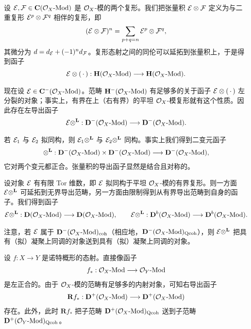设 $\mathcal{E},\mathcal{F}\in\mathbf{C}(\mathcal{O}_X\text{-}\mathrm{Mod})$ 是 $\mathcal{O}_X$-模的两个复形。我们把张量积 $\mathcal{E}\otimes\mathcal{F}$ 定义为与二重复形 $\mathcal{E}^{p}\otimes\mathcal{F}^{q}$ 相伴的复形，即
\begin{equation*}
(\mathcal{E}\otimes\mathcal{F})^{n}=\sum_{p+q=n}\mathcal{E}^{p}\otimes\mathcal{F}^{q},
\end{equation*}
其微分为 $d=d_{\mathcal{E}}+(-1)^{n}d_{\mathcal{F}}$。复形态射之间的同伦可以延拓到张量积上，于是得到函子
\begin{equation*}
\mathcal{E}\otimes(\,\cdot\,):\mathbf{H}(\mathcal{O}_X\text{-}\mathrm{Mod})\longrightarrow\mathbf{H}(\mathcal{O}_X\text{-}\mathrm{Mod}).
\end{equation*}

现在设 $\mathcal{E}\in\mathbf{C}^{-}(\mathcal{O}_X\text{-}\mathrm{Mod})$。范畴 $\mathbf{H}^{-}(\mathcal{O}_X\text{-}\mathrm{Mod})$ 有足够多的关于函子 $\mathcal{E}\otimes(\,\cdot\,)$ 左分裂的对象；事实上，有界在上（右有界）的平坦 $\mathcal{O}_X$-模复形就有这个性质。因此存在左导出函子
\begin{equation*}
\mathcal{E}\otimes^{\mathbf{L}}:\mathbf{D}^{-}(\mathcal{O}_X\text{-}\mathrm{Mod})\longrightarrow\mathbf{D}^{-}(\mathcal{O}_X\text{-}\mathrm{Mod}).
\end{equation*}

若 $\mathcal{E}_{1}$ 与 $\mathcal{E}_{2}$ 拟同构，则 $\mathcal{E}_{1}\otimes^{\mathbf{L}}$ 与 $\mathcal{E}_{2}\otimes^{\mathbf{L}}$ 同构。事实上我们得到二变元函子
\begin{equation*}
\otimes^{\mathbf{L}}:\mathbf{D}^{-}(\mathcal{O}_X\text{-}\mathrm{Mod})\times\mathbf{D}^{-}(\mathcal{O}_X\text{-}\mathrm{Mod})\longrightarrow\mathbf{D}^{-}(\mathcal{O}_X\text{-}\mathrm{Mod}),
\end{equation*}
它对两个变元都正合。张量积的导出函子显然是结合且对称的。

设对象 $\mathcal{E}$ 有有限 Tor 维数，即 $\mathcal{E}$ 拟同构于平坦 $\mathcal{O}_X$-模的有界复形。则一方面 $\mathcal{E}\otimes^{\mathbf{L}}$ 可延拓到无界导出范畴，另一方面由限制得到从有界导出范畴到自身的函子。我们得到函子
\begin{equation*}
\mathcal{E}\otimes^{\mathbf{L}}:\mathbf{D}(\mathcal{O}_X\text{-}\mathrm{Mod})\longrightarrow\mathbf{D}(\mathcal{O}_X\text{-}\mathrm{Mod}),\qquad
\mathcal{E}\otimes^{\mathbf{L}}:\mathbf{D}^{b}(\mathcal{O}_X\text{-}\mathrm{Mod})\longrightarrow\mathbf{D}^{b}(\mathcal{O}_X\text{-}\mathrm{Mod}).
\end{equation*}

注意，若 $\mathcal{E}$ 属于 $\mathbf{D}^{-}(\mathcal{O}_X\text{-}\mathrm{Mod})_{\mathrm{coh}}$（相应地，$\mathbf{D}^{-}(\mathcal{O}_X\text{-}\mathrm{Mod})_{\mathrm{Qcoh}}$），则 $\mathcal{E}\otimes^{\mathbf{L}}$ 把具有（拟）凝聚上同调的对象送到具有（拟）凝聚上同调的对象。

设 $f:X\to Y$ 是诺特概形的态射。直接像函子
\begin{equation*}
f_{*}:\mathcal{O}_X\text{-}\mathrm{Mod}\longrightarrow\mathcal{O}_Y\text{-}\mathrm{Mod}
\end{equation*}
是左正合的。由于 $\mathcal{O}_X$-模的范畴有足够多的内射对象，可知右导出函子
\begin{equation*}
\mathbf{R}f_{*}:\mathbf{D}^{+}(\mathcal{O}_X\text{-}\mathrm{Mod})\longrightarrow\mathbf{D}^{+}(\mathcal{O}_X\text{-}\mathrm{Mod})
\end{equation*}
存在。此外，此时 $\mathbf{R}f_{*}$ 把子范畴 $\mathbf{D}^{+}(\mathcal{O}_X\text{-}\mathrm{Mod})_{\mathrm{Qcoh}}$ 送到子范畴 $\mathbf{D}^{+}(\mathcal{O}_Y\text{-}\mathrm{Mod})_{\mathrm{Qcoh}}$。

